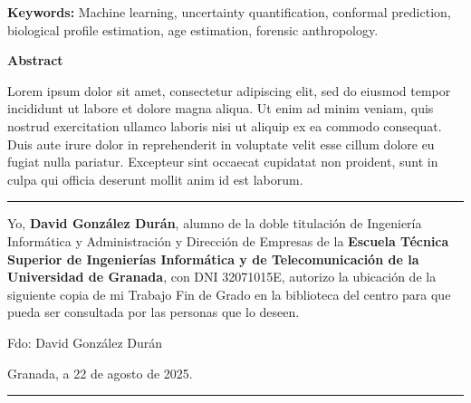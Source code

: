 \vspace{0.7cm}

\noindent\textbf{Keywords:} Machine learning, uncertainty quantification, conformal prediction, biological profile estimation, age estimation, forensic anthropology.

\vspace{0.7cm}

\noindent\textbf{Abstract}

Lorem ipsum dolor sit amet, consectetur adipiscing elit, sed do eiusmod tempor incididunt ut labore et dolore magna aliqua. Ut enim ad minim veniam, quis nostrud exercitation ullamco laboris nisi ut aliquip ex ea commodo consequat. Duis aute irure dolor in reprehenderit in voluptate velit esse cillum dolore eu fugiat nulla pariatur. Excepteur sint occaecat cupidatat non proident, sunt in culpa qui officia deserunt mollit anim id est laborum.



\cleardoublepage
\thispagestyle{empty}

\noindent\rule{\textwidth}{2pt}\par\vspace{4.5ex}

Yo, \textbf{David González Durán}, alumno de la doble titulación de Ingeniería Informática y Administración y Dirección de Empresas de la \textbf{Escuela Técnica Superior de Ingenierías Informática y de Telecomunicación de la Universidad de Granada}, con DNI 32071015E, autorizo la ubicación de la siguiente copia de mi Trabajo Fin de Grado en la biblioteca del centro para que pueda ser consultada por las personas que lo deseen.

\vspace{6cm}

\noindent Fdo: David González Durán

\vspace{2cm}

\begin{flushright}
    Granada, a 22 de agosto de 2025.
\end{flushright}


\cleardoublepage
\thispagestyle{empty}

\noindent\rule{\textwidth}{2pt}\par\vspace{4.5ex}

